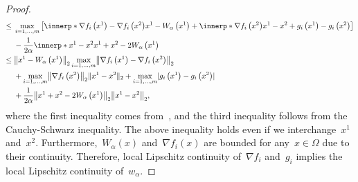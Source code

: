 \documentclass[../../main]{subfiles}
\begin{document}
\begin{proof}
\begin{align}
        \le{} & \max_{i = 1, \dots, m} \left[ \innerp*{\nabla f_i\left(x^1\right) - \nabla f_i\left(x^2\right)}{x^1 - W_\alpha\left(x^1\right)} + \innerp*{\nabla f_i\left(x^2\right)}{x^1 - x^2} + g_i\left(x^1\right) - g_i\left(x^2\right) \right]         \\
              & - \frac{1}{2 \alpha} \innerp*{x^1 - x^2}{x^1 + x^2 - 2 W_\alpha\left(x^1\right)}                                                                                                                                                              \\
        \le{} & \norm*{x^1 - W_\alpha\left(x^1\right)}_2 \max_{i = 1, \dots, m} \norm*{\nabla f_i\left(x^1\right) - \nabla f_i\left(x^2\right)}_2                                                                                                             \\
              & + \max_{i = 1, \dots, m} \norm*{\nabla f_i\left(x^2\right)}_2 \norm{x^1 - x^2}_2 + \max_{i = 1, \dots, m} \abs{g_i\left(x^1\right) - g_i\left(x^2\right)}                                                                                     \\
              & + \frac{1}{2 \alpha} \norm*{x^1 + x^2 - 2 W_\alpha\left(x^1\right)}_2 \norm*{x^1 - x^2}_2
        ,\end{align}
    where the first inequality comes from~, and the third inequality follows from the Cauchy-Schwarz inequality.
    The above inequality holds even if we interchange~$x^1$ and~$x^2$.
    Furthermore,~$W_\alpha(x)$ and~$\nabla f_i(x)$ are bounded for any~$x \in \Omega$ due to their continuity.
    Therefore, local Lipschitz continuity of~$\nabla f_i$ and~$g_i$ implies the local Lipschitz continuity of~$w_\alpha$.
\end{proof}
\end{document}
